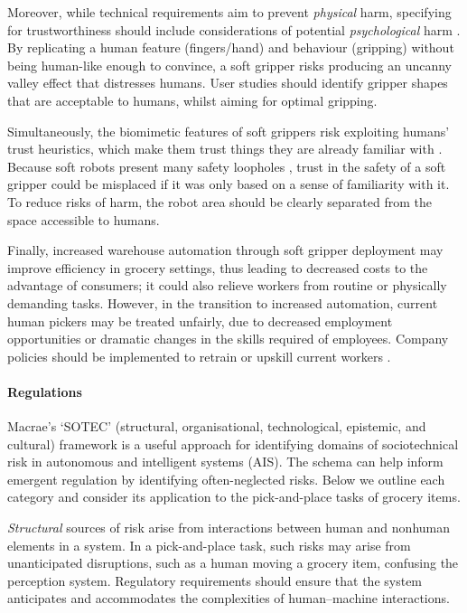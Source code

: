 \documentclass[lettersize,journal]{IEEEtran}
\begin{document}
Moreover, while technical requirements aim to prevent \emph{physical} harm, specifying for trustworthiness should include considerations of potential \emph{psychological} harm \cite{Porter2022}. By replicating a human feature (fingers/hand) and behaviour (gripping) without being human-like enough to convince, a soft gripper risks producing an uncanny valley effect \cite{moore2012bayesian} that distresses humans. User studies should identify gripper shapes that are acceptable to humans, whilst aiming for optimal gripping.  
	
 
Simultaneously, the biomimetic features of soft grippers risk exploiting humans’ trust heuristics, which make them trust things they are already familiar with \cite{Manzini}. Because soft robots present many safety loopholes \cite{abidi2017intrinsic}, trust in the safety of a soft gripper could be misplaced if it was only based on a sense of familiarity with it. To reduce risks of harm, the robot area should be clearly separated from the space accessible to humans.

 
Finally, increased warehouse automation through soft gripper deployment may improve efficiency in grocery settings, thus leading to decreased costs to the advantage of consumers; it could also relieve workers from routine or physically demanding tasks. However, in the transition to increased automation, current human pickers may be treated unfairly, due to decreased employment opportunities or dramatic changes in the skills required of employees. Company policies should be implemented to retrain or upskill current workers \cite{georgieff2021happened}.
\\


\paragraph{Regulations}\label{regulation}

Macrae’s \cite{Macrae2022} ‘SOTEC’ (structural, organisational, technological, epistemic, and cultural) framework is a useful approach for identifying domains of sociotechnical risk in autonomous and intelligent systems (AIS). The schema can help inform emergent regulation by identifying often-neglected risks. Below we outline each category and consider its application to the pick-and-place tasks of grocery items.

\emph{Structural} sources of risk arise from interactions between human and nonhuman elements in a system.
In a pick-and-place task, such risks may arise from unanticipated disruptions, such as a human moving a grocery item, confusing the perception system. Regulatory requirements should ensure that the system anticipates and accommodates the complexities of human–machine interactions.
\end{document}
